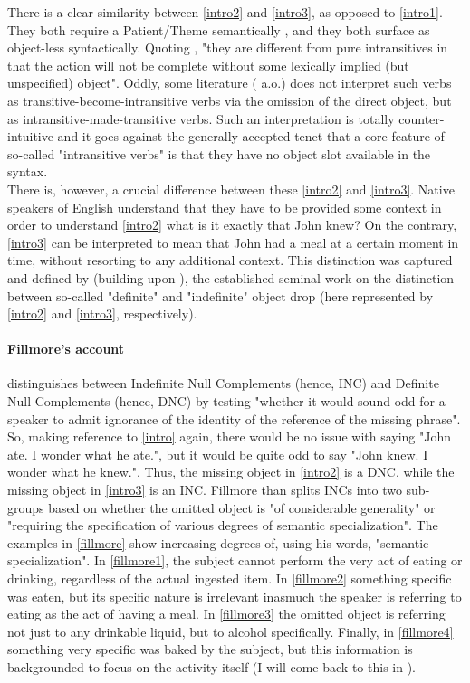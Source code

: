 There is a clear similarity between \ref{intro2} and \ref{intro3}, as opposed to \ref{intro1}. They both require a Patient/Theme semantically \parencite[510]{Somers1984}, and they both surface as object-less syntactically. Quoting \textcite[48]{Yasutake1987}, "they are different from pure intransitives in that the action will not be complete without some lexically implied (but unspecified) object". Oddly, some literature (\textcite{BourmayanRecanati2013, Liu2008} a.o.) does not interpret such verbs as transitive-become-intransitive verbs via the omission of the direct object, but as intransitive-made-transitive verbs. Such an interpretation is totally counter-intuitive and it goes against the generally-accepted tenet that a core feature of so-called "intransitive verbs" is that they have no object slot available in the syntax.\\
There is, however, a crucial difference between these \ref{intro2} and \ref{intro3}. Native speakers of English understand that they have to be provided some context in order to understand \ref{intro2} \textemdash what is it exactly that John knew? On the contrary, \ref{intro3} can be interpreted to mean that John had a meal at a certain moment in time, without resorting to any additional context. This distinction was captured and defined by \textcite{Fillmore1986} (building upon \textcite{fillmore1969types, Allerton1975}), the established seminal work on the distinction between so-called "definite" and "indefinite" object drop (here represented by \ref{intro2} and \ref{intro3}, respectively).

\paragraph{Fillmore's account}
\textcite[96]{Fillmore1986} distinguishes between Indefinite Null Complements (hence, INC) and Definite Null Complements (hence, DNC) by testing "whether it would sound odd for a speaker to admit ignorance of the identity of the reference of the missing phrase". So, making reference to \ref{intro} again, there would be no issue with saying "John ate. I wonder what he ate.", but it would be quite odd to say "John knew. I wonder what he knew.". Thus, the missing object in \ref{intro2} is a DNC, while the missing object in \ref{intro3} is an INC. Fillmore than splits INCs into two sub-groups based on whether the omitted object is "of considerable generality" or "requiring the specification of various degrees of semantic specialization". The examples in \ref{fillmore} \parencite[96-97]{Fillmore1986} show increasing degrees of, using his words, "semantic specialization". In \ref{fillmore1}, the subject cannot perform the very act of eating or drinking, regardless of the actual ingested item. In \ref{fillmore2} something specific was eaten, but its specific nature is irrelevant inasmuch the speaker is referring to eating as the act of having a meal. In \ref{fillmore3} the omitted object is referring not just to any drinkable liquid, but to alcohol specifically. Finally, in \ref{fillmore4} something very specific was baked by the subject, but this information is backgrounded to focus on the activity itself (I will come back to this in ).

